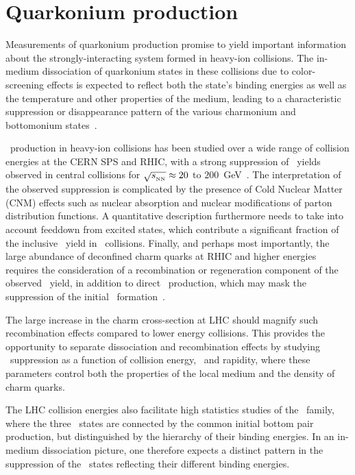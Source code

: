 \section{Quarkonium production}
\label{sec:qurkonia}
Measurements of quarkonium production promise to yield important information about the
strongly-interacting system formed in heavy-ion collisions.  
The in-medium dissociation of quarkonium states in these collisions due to color-screening effects
is expected to reflect both the state's binding energies as
well as the temperature and other properties of the medium, leading to a characteristic
suppression or disappearance pattern of the various charmonium and 
bottomonium states~\cite{Matsui:1986dk,Digal:2001ue,Mocsy:2007jz}.

\jpsi\ production in heavy-ion collisions has been studied over a wide range of
collision energies at the CERN SPS and RHIC, with a strong suppression of \jpsi\
yields observed in central collisions for $\sqrt{s_{_{\rm NN}}} \approx 20$ to
$200$~GeV~\cite{Baglin:1994ui,Alessandro:2004ap,Alessandro:2006ju,Adare:2006ns,
Arnaldi:2007zz,Adare:2011yf}.
The interpretation of the observed suppression is complicated by the presence
of Cold Nuclear Matter (CNM) effects such as nuclear absorption and nuclear
modifications of parton distribution functions. A quantitative
description furthermore needs to take into account feeddown from excited states,
which contribute a significant fraction of the inclusive \jpsi\ yield in \pp\ collisions.
Finally, and perhaps most importantly, the large abundance of deconfined charm quarks
at RHIC and higher energies requires the consideration of a recombination or regeneration
component of the observed \jpsi\ yield, in addition to direct \jpsi\ production, which 
may mask the suppression of the initial
\jpsi\ formation~\cite{BraunMunzinger:2000px,Thews:2000rj,Zhao:2007hh,Capella:2007jv}.

The large increase in the charm cross-section at LHC should magnify such recombination
effects compared to lower energy collisions. This provides the opportunity to separate
dissociation and recombination effects by studying \jpsi\ suppression
as a function of collision energy, \pT\ and rapidity, where these parameters
control both the properties of the local medium and the density of charm quarks.

The LHC collision energies also facilitate high statistics studies of the \PgU\ family, where
the three \PgUn\ states are connected by the common initial bottom pair production,
but distinguished by the hierarchy of their binding energies. In an
in-medium dissociation picture, one therefore expects a distinct pattern in the suppression
of the \PgUn\ states reflecting their different binding energies.

